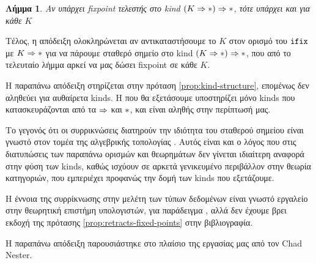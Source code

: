     \newtheorem{corollary}{Λήμμα}
    \begin{corollary}
    Αν υπάρχει fixpoint τελεστής στο kind $(K \Rightarrow \operatorname{\ast}) \Rightarrow \operatorname{\ast}$, τότε υπάρχει
    και για κάθε $K$
    \end{corollary}


Τέλος, η απόδειξη ολοκληρώνεται αν αντικαταστήσουμε το $K$ στον ορισμό του $\operatorname{\texttt{ifix}}$ με
$K \Rightarrow \operatorname{\ast}$ για να πάρουμε σταθερό σημείο στο kind $(K \Rightarrow \operatorname{\ast}) \Rightarrow \operatorname{\ast}$,
που από το τελευταίο λήμμα αρκεί να μας δώσει fixpoint σε κάθε $K$.



Η παραπάνω απόδειξη στηρίζεται στην πρόταση \ref{prop:kind-structure},
επομένως δεν αληθεύει για αυθαίρετα kinds. Η \FOMF{} που θα εξετάσουμε
υποστηρίζει μόνο kinds που κατασκευράζονται από τα $\Rightarrow$ και $\operatorname{\ast}$,
και είναι αληθής στην περίπτωσή μας.

Το γεγονός ότι οι συρρικνώσεις διατηρούν την ιδιότητα του σταθερού σημείου είναι γνωστό στον
τομέα της αλγεβρικής τοπολογίας \cite{eilenberg-steenrod}. Αυτός είναι και ο λόγος που στις διατυπώσεις
των παραπάνω ορισμών και θεωρημάτων δεν γίνεται ιδιαίτερη αναφορά στην φύση των kinds, καθώς
ισχύουν σε αρκετά γενικευμένο περιβάλλον στην θεωρία κατηγοριών, που εμπεριέχει προφανώς την
δομή των kinds που εξετάζουμε.

Η έννοια της συρρίκνωσης στην μελέτη των τύπων δεδομένων είναι γνωστό εργαλείο στην θεωρητική
επιστήμη υπολογιστών, για παράδειγμα
 \cite{stirling}, αλλά δεν έχουμε βρει εκδοχή της πρότασης \ref{prop:retracts-fixed-points} στην βιβλιογραφία.

Η παραπάνω απόδειξη παρουσιάστηκε στο πλαίσιο της εργασίας μας από τον Chad Nester.
